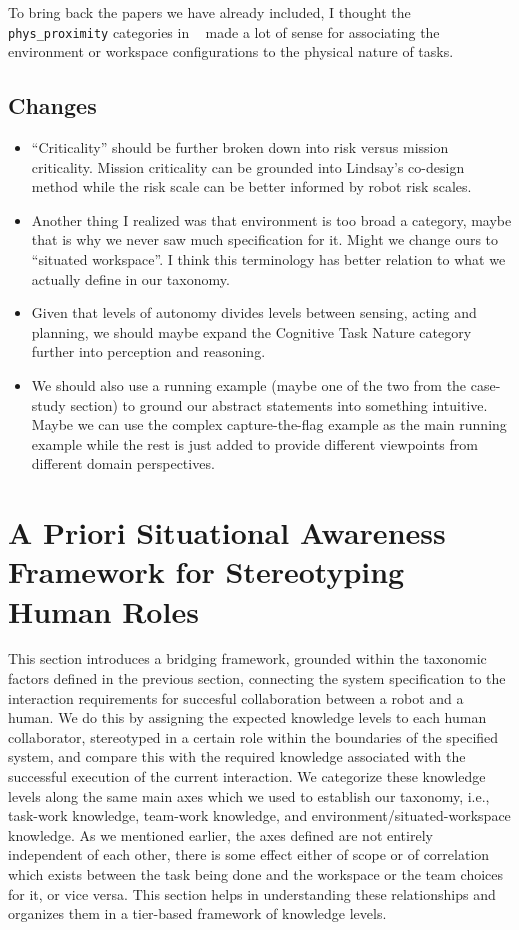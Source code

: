\documentclass[letterpaper, 10 pt, conference]{ieeeconf} %
\theoremstyle{definition} \newtheorem{definition}{Definition}
\newcommand{\citet}[1]{\citeauthor{#1}~\cite{#1}}
\begin{document}
To bring back the papers we have already included, I thought the
\texttt{phys\_proximity} categories in \citet{Yanco2004updated} made a lot of
sense for associating the environment or workspace configurations to the
physical nature of tasks.

\subsection{Changes}
\begin{itemize}{}
  \item ``Criticality'' should be further broken down into risk versus mission
        criticality. Mission criticality can be grounded into Lindsay's co-design
        method while the risk scale can be better informed by robot risk scales.
  \item Another thing I realized was that environment is too broad a category,
        maybe that is why we never saw much specification for it. Might we change
        ours to ``situated workspace''. I think this terminology has better relation
        to what we actually define in our taxonomy.
  \item Given that levels of autonomy divides levels between sensing, acting and
        planning, we should maybe expand the Cognitive Task Nature category further
        into perception and reasoning.
  \item We should also use a running example (maybe one of the two from the
        case-study section) to ground our abstract statements into something
        intuitive. Maybe we can use the complex capture-the-flag example as the main
        running example while the rest is just added to provide different viewpoints
        from different domain perspectives.
\end{itemize}

\section{A Priori Situational Awareness Framework for Stereotyping Human Roles}

This section introduces a bridging framework, grounded within the taxonomic
factors defined in the previous section, connecting the system specification to
the interaction requirements for succesful collaboration between a robot and a
human. We do this by assigning the expected knowledge levels to each human
collaborator, stereotyped in a certain role within the boundaries of the
specified system, and compare this with the required knowledge associated with
the successful execution of the current interaction. We categorize these
knowledge levels along the same main axes which we used to establish our
taxonomy, i.e., task-work knowledge, team-work knowledge, and
environment/situated-workspace knowledge. As we mentioned earlier, the axes
defined are not entirely independent of each other, there is some effect either
of scope or of correlation which exists between the task being done and the
workspace or the team choices for it, or vice versa. This section helps in
understanding these relationships and organizes them in a tier-based framework
of knowledge levels.
\end{document}
